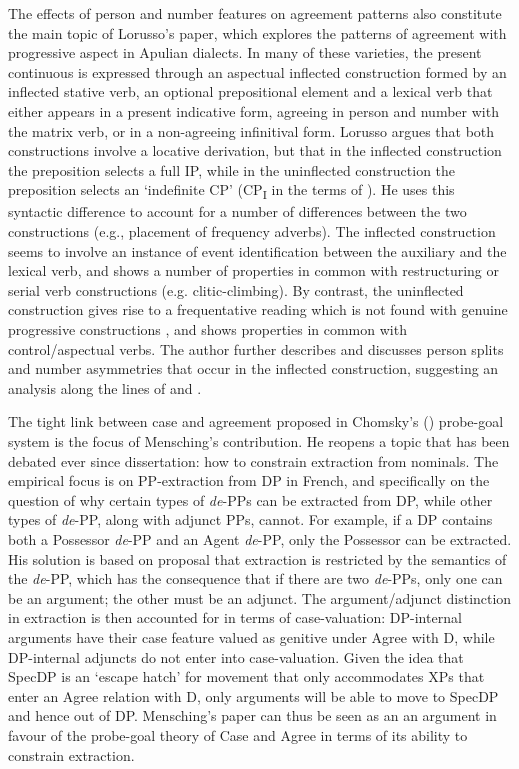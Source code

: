 \documentclass[output=paper]{langsci/langscibook}
\begin{document}
The effects of person and number features on agreement patterns also constitute the main topic of Lorusso’s paper, which explores the patterns of agreement with progressive aspect in Apulian dialects. In many of these varieties, the present continuous is expressed through an aspectual inflected construction formed by an inflected stative verb, an optional prepositional element and a lexical verb that either appears in a present indicative form, agreeing in person and number with the matrix verb, or in a non-agreeing infinitival form. Lorusso argues that both constructions involve a locative derivation, but that in the inflected construction the preposition selects a full IP, while in the uninflected construction the preposition selects an ‘indefinite CP' (CP\textsubscript{I} in the terms of \citealt{Manzini2003}). He uses this syntactic difference to account for a number of differences between the two constructions (e.g., placement of frequency adverbs). The inflected construction seems to involve an instance of event identification \citep{Kratzer1996} between the auxiliary and the lexical verb, and shows a number of properties in common with restructuring or serial verb constructions (e.g. clitic-climbing). By contrast, the uninflected construction gives rise to a frequentative reading which is not found with genuine progressive constructions \citep{Chierchia1995}, and shows properties in common with control/aspectual verbs. The author further describes and discusses person splits and number asymmetries that occur in the inflected construction, suggesting an analysis along the lines of \citet{Bobaljik2008Phi} and \citet{Manzini2007,Manzini2011Grammatical}.

The tight link between case and agreement proposed in Chomsky’s (\citeyear{Chomsky2000,Chomsky2001Derivation}) probe-goal system is the focus of Mensching’s contribution. He reopens a topic that has been debated ever since  dissertation: how to constrain extraction from nominals. The empirical focus is on PP-extraction from DP in French, and specifically on the question of why certain types of \textit{de}{}-PPs can be extracted from DP, while other types of \textit{de}{}-PP, along with adjunct PPs, cannot. For example, if a DP contains both a Possessor \textit{de}{}-PP and an Agent \textit{de}{}-PP, only the Possessor can be extracted. His solution is based on  proposal that extraction is restricted by the semantics of the \textit{de}{}-PP, which has the consequence that if there are two \textit{de}{}-PPs, only one can be an argument; the other must be an adjunct. The argument\slash adjunct distinction in extraction is then accounted for in terms of case-valuation: DP-internal arguments have their case feature valued as genitive under Agree with D, while DP-internal adjuncts do not enter into case-valuation. Given the idea that SpecDP is an ‘escape hatch’ for movement that only accommodates XPs that enter an Agree relation with D, only arguments will be able to move to SpecDP and hence out of DP. Mensching’s paper can thus be seen as an an argument in favour of the probe-goal theory of Case and Agree in terms of its ability to constrain extraction.
\end{document}

